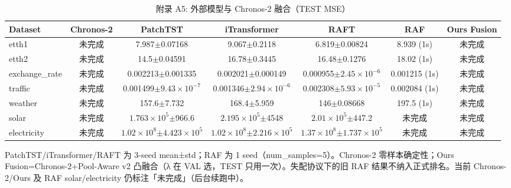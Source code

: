 \begin{table}[htbp]
  \centering
  \caption{附录 A5: 外部模型与 Chronos-2 融合（TEST MSE）}
  \label{tab:appendix_external}
  \begin{tabular}{lcccccc}
    \toprule
    Dataset & Chronos-2 & PatchTST & iTransformer & RAFT & RAF & Ours Fusion \\
    \midrule
    etth1 & 未完成 & 7.987$\pm$0.07168 & 9.067$\pm$0.2118 & 6.819$\pm$0.00824 & 8.939 (1s) & 未完成 \\
    etth2 & 未完成 & 14.5$\pm$0.04591 & 16.78$\pm$0.3445 & 16.48$\pm$0.1276 & 18.02 (1s) & 未完成 \\
    exchange\_rate & 未完成 & 0.002213$\pm$0.001335 & 0.002021$\pm$0.000149 & 0.000955$\pm$$2.45\times10^{-6}$ & 0.001215 (1s) & 未完成 \\
    traffic & 未完成 & 0.001499$\pm$$9.43\times10^{-7}$ & 0.001346$\pm$$2.94\times10^{-6}$ & 0.002308$\pm$$5.93\times10^{-5}$ & 0.002084 (1s) & 未完成 \\
    weather & 未完成 & 157.6$\pm$7.732 & 168.4$\pm$5.959 & 146$\pm$0.08668 & 197.5 (1s) & 未完成 \\
    solar & 未完成 & $1.763\times10^{5}$$\pm$966.6 & $2.195\times10^{5}$$\pm$4548 & $2.01\times10^{5}$$\pm$447.2 & 未完成 & 未完成 \\
    electricity & 未完成 & $1.02\times10^{8}$$\pm$$4.423\times10^{5}$ & $1.02\times10^{8}$$\pm$$2.216\times10^{5}$ & $1.37\times10^{8}$$\pm$$1.737\times10^{5}$ & 未完成 & 未完成 \\
    \bottomrule
  \end{tabular}
  {\footnotesize PatchTST/iTransformer/RAFT 为 3-seed mean±std；RAF 为 1 seed（num\_samples=5）。Chronos-2 零样本确定性；Ours Fusion=Chronos-2+Pool-Aware v2 凸融合（λ 在 VAL 选，TEST 只用一次）。失配协议下的旧 RAF 结果不纳入正式排名。当前 Chronos-2/Ours 及 RAF solar/electricity 仍标注「未完成」（后台续跑中）。}
\end{table}

